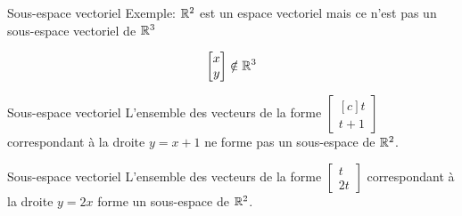 \documentclass[french, handout]{beamer}
\begin{document}
\begin{frame}{Sous-espace vectoriel}
Exemple: $\mathbb{R}^2$ est un espace vectoriel mais ce n'est pas 
un sous-espace vectoriel de $\mathbb{R}^3$

\[
\begin{bmatrix}
x \\ y
\end{bmatrix}
\notin \mathbb{R}^3
\]
\end{frame}

\begin{frame}{Sous-espace vectoriel}
L'ensemble des vecteurs de la forme
$\displaystyle
\begin{bmatrix}[c]
t\\
t+1
\end{bmatrix}
$ correspondant à la droite $y=x+1$ ne forme pas un sous-espace de $\mathbb{R}^2$.
\end{frame}

\begin{frame}{Sous-espace vectoriel}
L'ensemble des vecteurs de la forme
$\displaystyle
\begin{bmatrix}
t\\
2t
\end{bmatrix}
$ correspondant à la droite $y=2x$ forme un sous-espace de $\mathbb{R}^2$.
\end{frame}
\end{document}
